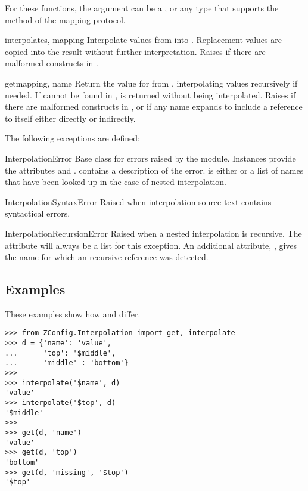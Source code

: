 \documentclass{howto}
\begin{document}
For these functions, the  argument can be a ,
or any type that supports the  method of the mapping
protocol.

\begin{funcdesc}{interpolate}{s, mapping}
  Interpolate values from  into .  Replacement
  values are copied into the result without further interpretation.
  Raises  if there are malformed
  constructs in .
\end{funcdesc}

\begin{funcdesc}{get}{mapping, name}
  Return the value for  from , interpolating
  values recursively if needed.  If  cannot be found in
  ,  is returned without being
  interpolated.
  Raises  if there are malformed
  constructs in , or  if
  any name expands to include a reference to itself either directly or
  indirectly.
\end{funcdesc}

The following exceptions are defined:

\begin{excdesc}{InterpolationError}
  Base class for errors raised by the 
  module.  Instances provide the attributes  and
  .   contains a description of the
  error.   is either  or a list of names
  that have been looked up in the case of nested interpolation.
\end{excdesc}

\begin{excdesc}{InterpolationSyntaxError}
  Raised when interpolation source text contains syntactical errors.
\end{excdesc}

\begin{excdesc}{InterpolationRecursionError}
  Raised when a nested interpolation is recursive.  The
   attribute will always be a list for this
  exception.  An additional attribute, , gives the name
  for which an recursive reference was detected.
\end{excdesc}


\subsection{Examples}

These examples show how  and 
differ.

\begin{verbatim}
>>> from ZConfig.Interpolation import get, interpolate
>>> d = {'name': 'value',
...      'top': '$middle',
...      'middle' : 'bottom'}
>>>
>>> interpolate('$name', d)
'value'
>>> interpolate('$top', d)
'$middle'
>>>
>>> get(d, 'name')
'value'
>>> get(d, 'top')
'bottom'
>>> get(d, 'missing', '$top')
'$top'
\end{verbatim}
\end{document}
